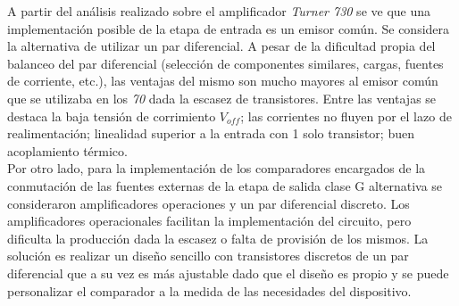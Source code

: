 
	A partir del análisis realizado sobre el amplificador \emph{Turner 730} se ve que una implementación posible de la etapa de entrada es un emisor común. Se considera la alternativa de utilizar un par diferencial. A pesar de la dificultad propia del balanceo del par diferencial (selección de componentes similares, cargas, fuentes de corriente, etc.), las ventajas del mismo son mucho mayores al emisor común que se utilizaba en los \emph{70} dada la escasez de transistores. Entre las ventajas se destaca la baja tensión de corrimiento $V_{off}$; las corrientes no fluyen por el lazo de realimentación; linealidad superior a la entrada con 1 solo transistor; buen acoplamiento térmico.\\

	Por otro lado, para la implementación de los comparadores encargados de la conmutación de las fuentes externas de la etapa de salida clase G alternativa se consideraron amplificadores operaciones y un par diferencial discreto. Los amplificadores operacionales facilitan la implementación del circuito, pero dificulta la producción dada la escasez o falta de provisión de los mismos. La solución es realizar un diseño sencillo con transistores discretos de un par diferencial que a su vez es más ajustable dado que el diseño es propio y se puede personalizar el comparador a la medida de las necesidades del dispositivo.\\



